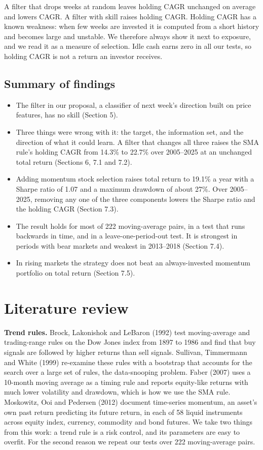 \documentclass[11pt]{article}
\providecommand{\tightlist}{\setlength{\itemsep}{2pt}\setlength{\parskip}{0pt}}
\begin{document}
A filter that drops weeks at random leaves holding CAGR unchanged on average and lowers CAGR. A filter with skill raises holding CAGR. Holding CAGR has a known weakness: when few weeks are invested it is computed from a short history and becomes large and unstable. We therefore always show it next to exposure, and we read it as a measure of selection. Idle cash earns zero in all our tests, so holding CAGR is not a return an investor receives.

\subsection{Summary of findings}

\begin{itemize}
\tightlist
\item
  The filter in our proposal, a classifier of next week's direction built on price features, has no skill (Section 5).
\item
  Three things were wrong with it: the target, the information set, and the direction of what it could learn. A filter that changes all three raises the SMA rule's holding CAGR from 14.3\% to 22.7\% over 2005--2025 at an unchanged total return (Sections 6, 7.1 and 7.2).
\item
  Adding momentum stock selection raises total return to 19.1\% a year with a Sharpe ratio of 1.07 and a maximum drawdown of about 27\%. Over 2005--2025, removing any one of the three components lowers the Sharpe ratio and the holding CAGR (Section 7.3).
\item
  The result holds for most of 222 moving-average pairs, in a test that runs backwards in time, and in a leave-one-period-out test. It is strongest in periods with bear markets and weakest in 2013--2018 (Section 7.4).
\item
  In rising markets the strategy does not beat an always-invested momentum portfolio on total return (Section 7.5).
\end{itemize}

\section{Literature review}

\textbf{Trend rules.} Brock, Lakonishok and LeBaron (1992) test moving-average and trading-range rules on the Dow Jones index from 1897 to 1986 and find that buy signals are followed by higher returns than sell signals. Sullivan, Timmermann and White (1999) re-examine these rules with a bootstrap that accounts for the search over a large set of rules, the data-snooping problem. Faber (2007) uses a 10-month moving average as a timing rule and reports equity-like returns with much lower volatility and drawdown, which is how we use the SMA rule. Moskowitz, Ooi and Pedersen (2012) document time-series momentum, an asset's own past return predicting its future return, in each of 58 liquid instruments across equity index, currency, commodity and bond futures. We take two things from this work: a trend rule is a risk control, and its parameters are easy to overfit. For the second reason we repeat our tests over 222 moving-average pairs.
\end{document}
